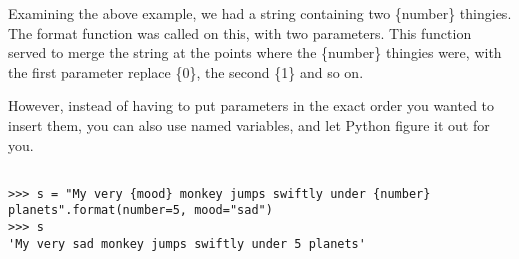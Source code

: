 Examining the above example, we had a string containing two \{number\} thingies.      The format function was called on this, with two parameters.    This function served to merge the string at the points where   the \{number\} thingies were, with the first parameter replace \{0\}, the second \{1\} and so on.     

However, instead of having to put parameters in the exact order you wanted to insert     them, you can also use named variables, and let Python figure it out for you. 
\begin{lstlisting}

>>> s = "My very {mood} monkey jumps swiftly under {number} planets".format(number=5, mood="sad")
>>> s
'My very sad monkey jumps swiftly under 5 planets'
\end{lstlisting}

